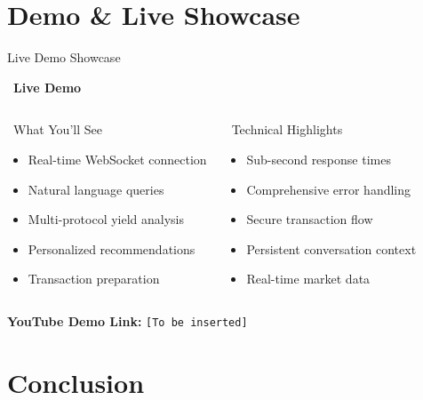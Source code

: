 \documentclass[aspectratio=169]{beamer}
\begin{document}
\section{Demo \& Live Showcase}

\begin{frame}{Live Demo Showcase}
\begin{center}
\large \faPlay\ \textbf{Live Demo}
\end{center}

\vspace{0.05cm}

\begin{columns}
\begin{block}{\faDesktop\ What You'll See}
\begin{itemize}
\item Real-time WebSocket connection
\item Natural language queries
\item Multi-protocol yield analysis
\item Personalized recommendations
\item Transaction preparation
\end{itemize}
\end{block}

\begin{block}{\faCode\ Technical Highlights}
\begin{itemize}
\item Sub-second response times
\item Comprehensive error handling
\item Secure transaction flow
\item Persistent conversation context
\item Real-time market data
\end{itemize}
\end{block}
\end{columns}

\vspace{0.05cm}
\begin{center}
\footnotesize \textbf{YouTube Demo Link:} \texttt{[To be inserted]}
\end{center}
\end{frame}

\section{Conclusion}
\end{document}
